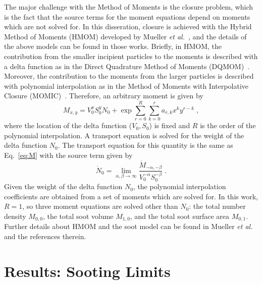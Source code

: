 The major challenge with the Method of Moments is the closure problem, which is the fact that the source terms for the moment equations depend on moments which are not solved for.  In this disseration, closure is achieved with the Hybrid Method of Moments (HMOM) developed by Mueller \emph{et al.}~\cite{mueller09a,mueller09b,mueller11a}, and the details of the above models can be found in those works.  Briefly, in HMOM, the contribution from the smaller incipient particles to the moments is described with a delta function as in the Direct Quadrature Method of Moments (DQMOM)~\cite{marchisio05}.  Moreover, the contribution to the moments from the larger particles is described with polynomial interpolation as in the Method of Moments with Interpolative Closure (MOMIC)~\cite{frenklach87}.  Therefore, an arbitrary moment is given by
\begin{equation}\label{eq:hmom}
  M_{x,y} = V_0^x S_0^y N_0 + \exp{\sum_{r=0}^R{\sum_{k=0}^r{a_{r,k}x^ky^{r-k}}}}\;,
\end{equation}
where the location of the delta function ($V_0,S_0$) is fixed and $R$ is the order of the polynomial interpolation.  A transport equation is solved for the weight of the delta function $N_0$.  The transport equation for this quantity is the same as Eq.~\ref{eq:M} with the source term given by
\begin{equation}\label{eq:N0}
  \dot{N}_0 = \lim_{\alpha,\beta\rightarrow\infty}{\frac{\dot{M}_{-\alpha,-\beta}}{V_0^{-\alpha}S_0^{-\beta}}}\;.
\end{equation}
Given the weight of the delta function $N_0$, the polynomial interpolation coefficients are obtained from a set of moments which are solved for.  In this work, $R=1$, so three moment equations are solved other than $N_0$: the total number density $M_{0,0}$, the total soot volume $M_{1,0}$, and the total soot surface area $M_{0,1}$.  Further details about HMOM and the soot model can be found in Mueller \emph{et al.}~\cite{mueller09a,mueller09b,mueller11a} and the references therein.

\section{Results: Sooting Limits}
\label{sec:biofuel-results}

